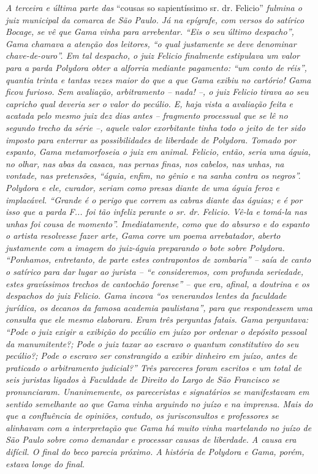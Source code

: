\begin{didascalia}
\emph{A terceira e última parte das} ``cousas so sapientíssimo sr. dr.
Felicio'' \emph{fulmina o juiz municipal da comarca de São Paulo. Já na
epígrafe, com versos do satírico Bocage, se vê que Gama vinha para
arrebentar. ``Eis o seu último despacho'', Gama chamava a atenção dos
leitores, ``o qual justamente se deve denominar chave-de-ouro''. Em tal
despacho, o juiz Felicio finalmente estipulava um valor para a parda
Polydora obter a alforria mediante pagamento: ``um conto de réis'',
quantia trinta e tantas vezes maior do que a que Gama exibiu no
cartório! Gama ficou furioso. Sem avaliação, arbitramento -- nada! --, o
juiz Felicio tirava ao seu capricho qual deveria ser o valor do pecúlio.
E, haja vista a avaliação feita e acatada pelo mesmo juiz dez dias antes
-- fragmento processual que se lê no segundo trecho da série --, aquele
valor exorbitante tinha todo o jeito de ter sido imposto para enterrar
as possibilidades de liberdade de Polydora. Tomado por espanto, Gama
metamorfoseia o juiz em animal. Felicio, então, seria uma águia, no
olhar, nas abas da casaca, nas pernas finas, nos cabelos, nas unhas, na
vontade, nas pretensões, ``águia, enfim, no gênio e na sanha contra os
negros''. Polydora e ele, curador, seriam como presas diante de uma águia
feroz e implacável. ``Grande é o perigo que correm as cabras diante das
águias; e é por isso que a parda F... foi tão infeliz perante o sr. dr.
Felicio. Vê-la e tomá-la nas unhas foi cousa de momento''. Imediatamente,
como que do absurso e do espanto o artista resolvesse fazer arte, Gama
corre um poema arrebatador, aberto justamente com a imagem do juiz-águia
preparando o bote sobre Polydora. ``Ponhamos, entretanto, de parte estes
contrapontos de zombaria'' -- saía de canto o satírico para dar lugar ao
jurista -- ``e consideremos, com profunda seriedade, estes gravíssimos
trechos de cantochão forense'' -- que era, afinal, a doutrina e os
despachos do juiz Felicio. Gama incova ``os venerandos lentes da
faculdade jurídica, os decanos da famosa academia paulistana'', para que
respondessem uma consulta que ele mesmo elaborara. Eram três perguntas
fatais. Gama perguntava: ``Pode o juiz exigir a exibição do pecúlio em
juízo por ordenar o depósito pessoal da manumitente?; Pode o juiz taxar
ao escravo o quantum constitutivo do seu pecúlio?; Pode o escravo ser
constrangido a exibir dinheiro em juízo, antes de praticado o
arbitramento judicial?'' Três pareceres foram escritos e um total de seis
juristas ligados à Faculdade de Direito do Largo de São Francisco se
pronunciaram. Unanimemente, os pareceristas e signatários se
manifestavam em sentido semelhante ao que Gama vinha arguindo no juízo e
na imprensa. Mais do que a confluência de opiniões, contudo, os
jurisconsultos e professores se alinhavam com a interpretação que Gama
há muito vinha martelando no juízo de São Paulo sobre como demandar e
processar causas de liberdade. A causa era difícil. O final do beco
parecia próximo. A história de Polydora e Gama, porém, estava longe do
final.}
\end{didascalia}

